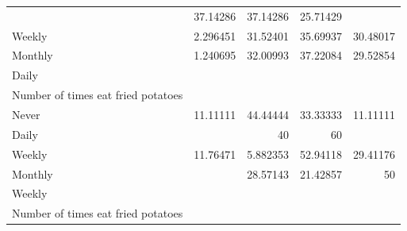\documentclass{article}
\begin{document}
\begin{table}[!h]
{\begin{tabular}{lllll}
			\multicolumn{1}{|r}{} &
			\multicolumn{1}{r}{37.14286} &
			\multicolumn{1}{r}{37.14286} &
			\multicolumn{1}{r}{25.71429} \\
			\multicolumn{1}{l}{\hspace{5em}Weekly} &
			\multicolumn{1}{|r}{2.296451} &
			\multicolumn{1}{r}{31.52401} &
			\multicolumn{1}{r}{35.69937} &
			\multicolumn{1}{r}{30.48017} \\
			\multicolumn{1}{l}{\hspace{5em}Monthly} &
			\multicolumn{1}{|r}{1.240695} &
			\multicolumn{1}{r}{32.00993} &
			\multicolumn{1}{r}{37.22084} &
			\multicolumn{1}{r}{29.52854} \\
			\multicolumn{1}{l}{\hspace{3em}Daily} &
			\multicolumn{1}{|r}{} &
			\multicolumn{1}{r}{} &
			\multicolumn{1}{r}{} &
			\multicolumn{1}{r}{} \\
			\multicolumn{1}{l}{\hspace{4em}Number of times eat fried potatoes} &
			\multicolumn{1}{|r}{} &
			\multicolumn{1}{r}{} &
			\multicolumn{1}{r}{} &
			\multicolumn{1}{r}{} \\
			\multicolumn{1}{l}{\hspace{5em}Never} &
			\multicolumn{1}{|r}{11.11111} &
			\multicolumn{1}{r}{44.44444} &
			\multicolumn{1}{r}{33.33333} &
			\multicolumn{1}{r}{11.11111} \\
			\multicolumn{1}{l}{\hspace{5em}Daily} &
			\multicolumn{1}{|r}{} &
			\multicolumn{1}{r}{40} &
			\multicolumn{1}{r}{60} &
			\multicolumn{1}{r}{} \\
			\multicolumn{1}{l}{\hspace{5em}Weekly} &
			\multicolumn{1}{|r}{11.76471} &
			\multicolumn{1}{r}{5.882353} &
			\multicolumn{1}{r}{52.94118} &
			\multicolumn{1}{r}{29.41176} \\
			\multicolumn{1}{l}{\hspace{5em}Monthly} &
			\multicolumn{1}{|r}{} &
			\multicolumn{1}{r}{28.57143} &
			\multicolumn{1}{r}{21.42857} &
			\multicolumn{1}{r}{50} \\
			\multicolumn{1}{l}{\hspace{3em}Weekly} &
			\multicolumn{1}{|r}{} &
			\multicolumn{1}{r}{} &
			\multicolumn{1}{r}{} &
			\multicolumn{1}{r}{} \\
			\multicolumn{1}{l}{\hspace{4em}Number of times eat fried potatoes} &
			\multicolumn{1}{|r}{} &
			\multicolumn{1}{r}{} &
			\multicolumn{1}{r}{} &

\end{tabular}}
\end{table}
\end{document}
